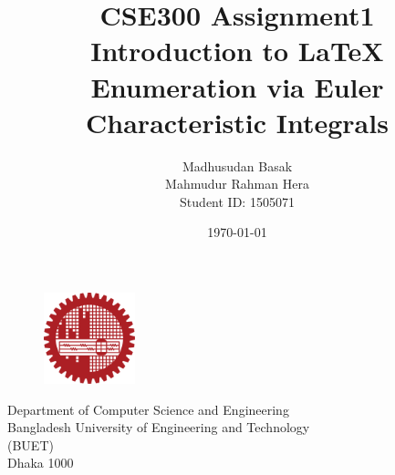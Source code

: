 \documentclass{article}
\title{\textbf{CSE300 Assignment1 \\
Introduction to \LaTeX}\\ \textbf{\hugeTarget Enumeration via Euler Characteristic
Integrals
}}
\author{ Madhusudan Basak \\
Mahmudur Rahman Hera \\
Student ID: 1505071 }
\begin{document}
\maketitle
\vspace{1.5in}

\begin{figure}[h]
    \centering
    \includegraphics[width=100]{graphics/buetlogo.png}
\end{figure}
\centering Department of Computer Science and Engineering \\
\centering Bangladesh University of Engineering and Technology \\
\centering (BUET) \\
\centering Dhaka 1000 \\
\centering \date{\today}
\newpage
\tableofcontents
\newpage
\end{document}
